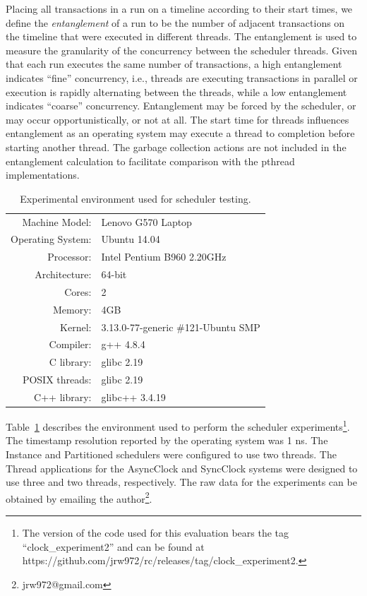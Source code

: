 Placing all transactions in a run on a timeline according to their start times, we define the \emph{entanglement} of a run to be the number of adjacent transactions on the timeline that were executed in different threads.
The entanglement is used to measure the granularity of the concurrency between the scheduler threads.
Given that each run executes the same number of transactions, a high entanglement indicates ``fine'' concurrency, i.e., threads are executing transactions in parallel or execution is rapidly alternating between the threads, while a low entanglement indicates ``coarse'' concurrency.
Entanglement may be forced by the scheduler, or may occur opportunistically, or not at all.
The start time for threads influences entanglement as an operating system may execute a thread to completion before starting another thread.
The garbage collection actions are not included in the entanglement calculation to facilitate comparison with the pthread implementations.

\begin{table}
\center
\begin{tabular}{rl}
Machine Model:    & Lenovo G570 Laptop \\
Operating System: & Ubuntu 14.04 \\
Processor:        & Intel Pentium B960 2.20GHz \\
Architecture:     & 64-bit \\
Cores:            & 2 \\
Memory:           & 4GB \\
Kernel:           & 3.13.0-77-generic \#121-Ubuntu SMP \\
Compiler:         & g++ 4.8.4 \\
C library:        & glibc 2.19 \\
POSIX threads:    & glibc 2.19 \\
C++ library:      & glibc++ 3.4.19 \\
\end{tabular}
\caption{Experimental environment used for scheduler testing.\label{environment}}
\end{table}

Table~\ref{environment} describes the environment used to perform the scheduler experiments\footnote{The version of the code used for this evaluation bears the tag ``clock\_experiment2'' and can be found at https://github.com/jrw972/rc/releases/tag/clock\_experiment2.}.
The timestamp resolution reported by the operating system was 1 ns.
The Instance and Partitioned schedulers were configured to use two threads.
The Thread applications for the AsyncClock and SyncClock systems were designed to use three and two threads, respectively.
The raw data for the experiments can be obtained by emailing the author\footnote{jrw972@gmail.com}.

